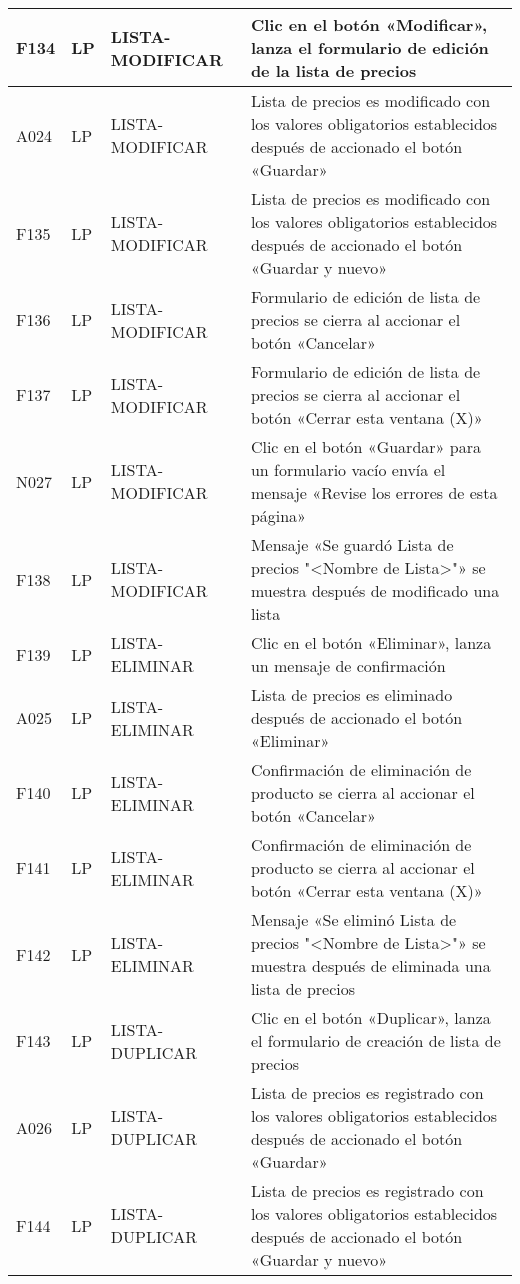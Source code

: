 \begin{landscape}
\begin{longtable}[htb]{|l|l|p{5.0cm}|p{13.0cm}|}
F134 & LP & LISTA-MODIFICAR & Clic en el botón «Modificar», lanza el formulario de edición de la lista de precios \\ \hline
A024 & LP & LISTA-MODIFICAR & Lista de precios es modificado con los valores obligatorios establecidos después de accionado el botón «Guardar» \\ \hline
F135 & LP & LISTA-MODIFICAR & Lista de precios es modificado con los valores obligatorios establecidos después de accionado el botón «Guardar y nuevo» \\ \hline
F136 & LP & LISTA-MODIFICAR & Formulario de edición de lista de precios se cierra al accionar el botón «Cancelar» \\ \hline
F137 & LP & LISTA-MODIFICAR & Formulario de edición de lista de precios se cierra al accionar el botón «Cerrar esta ventana (X)» \\ \hline
N027 & LP & LISTA-MODIFICAR & Clic en el botón «Guardar» para un formulario vacío envía el mensaje «Revise los errores de esta página» \\ \hline
F138 & LP & LISTA-MODIFICAR & Mensaje «Se guardó Lista de precios "<Nombre de Lista>"» se muestra después de modificado una lista \\ \hline
F139 & LP & LISTA-ELIMINAR & Clic en el botón «Eliminar», lanza un mensaje de confirmación \\ \hline
A025 & LP & LISTA-ELIMINAR & Lista de precios es eliminado después de accionado el botón «Eliminar» \\ \hline
F140 & LP & LISTA-ELIMINAR & Confirmación de eliminación de producto se cierra al accionar el botón «Cancelar» \\ \hline
F141 & LP & LISTA-ELIMINAR & Confirmación de eliminación de producto se cierra al accionar el botón «Cerrar esta ventana (X)» \\ \hline
F142 & LP & LISTA-ELIMINAR & Mensaje «Se eliminó Lista de precios "<Nombre de Lista>"» se muestra después de eliminada una lista de precios \\ \hline
F143 & LP & LISTA-DUPLICAR & Clic en el botón «Duplicar», lanza el formulario de creación de lista de precios \\ \hline
A026 & LP & LISTA-DUPLICAR & Lista de precios es registrado con los valores obligatorios establecidos después de accionado el botón «Guardar» \\ \hline
F144 & LP & LISTA-DUPLICAR & Lista de precios es registrado con los valores obligatorios establecidos después de accionado el botón «Guardar y nuevo» \\ \hline

\end{longtable}
\end{landscape}
